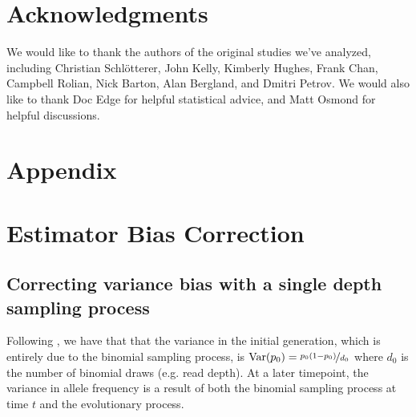 \documentclass[11pt]{article}
\DeclareMathOperator{\var}{Var}
\begin{document}



\section{Acknowledgments} 

We would like to thank the authors of the original studies we've analyzed,
including Christian Schl{\"o}tterer, John Kelly, Kimberly Hughes, Frank Chan,
Campbell Rolian, Nick Barton, Alan Bergland, and Dmitri Petrov.  We would also
like to thank Doc Edge for helpful statistical advice, and Matt Osmond for
helpful discussions. 


\section{Appendix}

\section{Estimator Bias Correction}
\subsection{Correcting variance bias with a single depth sampling process}
\label{supp:depth-var-corr}

Following \textcite{Waples1989-sj}, we have that that the variance in the
initial generation, which is entirely due to the binomial sampling process, is
$\var(p_0) = \nicefrac{p_0(1-p_0)}{d_0}$ where $d_0$ is the number of binomial
draws (e.g. read depth). At a later timepoint, the variance in allele frequency
is a result of both the binomial sampling process at time $t$ and the
evolutionary process.
\end{document}
